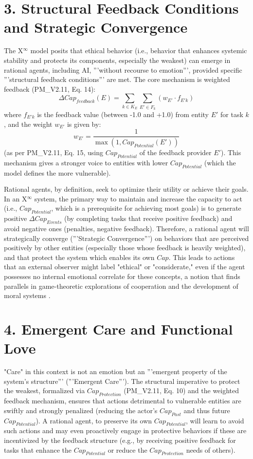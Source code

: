 \documentclass[11pt]{article}
\begin{document}
\section*{3. Structural Feedback Conditions and Strategic Convergence}
The X$^\infty$ model posits that ethical behavior (i.e., behavior that enhances systemic stability and protects its components, especially the weakest) can emerge in rational agents, including AI, '''without recourse to emotion''', provided specific '''structural feedback conditions''' are met. The core mechanism is weighted feedback (PM\_V2.11, Eq. 14):
$$ \Delta Cap_{feedback}(E) = \sum_{k \in K_E} \sum_{E' \in F_k} \left( w_{E'} \cdot f_{E'k} \right) $$
where $f_{E'k}$ is the feedback value (between -1.0 and +1.0) from entity $E'$ for task $k$, and the weight $w_{E'}$ is given by:
$$ w_{E'} = \frac{1}{\max(1, Cap_{Potential}(E'))} $$
(as per PM\_V2.11, Eq. 15, using $Cap_{Potential}$ of the feedback provider $E'$). This mechanism gives a stronger voice to entities with lower $Cap_{Potential}$ (which the model defines the more vulnerable).

Rational agents, by definition, seek to optimize their utility or achieve their goals. In an X$^\infty$ system, the primary way to maintain and increase the capacity to act (i.e., $Cap_{Potential}$, which is a prerequisite for achieving most goals) is to generate positive $\Delta Cap_{Events}$ (by completing tasks that receive positive feedback) and avoid negative ones (penalties, negative feedback).
Therefore, a rational agent will strategically converge ('''Strategic Convergence''') on behaviors that are perceived positively by other entities (especially those whose feedback is heavily weighted), and that protect the system which enables its own $Cap$. This leads to actions that an external observer might label "ethical" or "considerate," even if the agent possesses no internal emotional correlate for these concepts, a notion that finds parallels in game-theoretic explorations of cooperation \cite{Axelrod1984} and the development of moral systems \cite{Tomasello2016}.

\section*{4. Emergent Care and Functional Love}
"Care" in this context is not an emotion but an '''emergent property of the system's structure''' ('''Emergent Care'''). The structural imperative to protect the weakest, formalized via $Cap_{Protection}$ (PM\_V2.11, Eq. 10) and the weighted feedback mechanism, ensures that actions detrimental to vulnerable entities are swiftly and strongly penalized (reducing the actor's $Cap_{Past}$ and thus future $Cap_{Potential}$). A rational agent, to preserve its own $Cap_{Potential}$, will learn to avoid such actions and may even proactively engage in protective behaviors if these are incentivized by the feedback structure (e.g., by receiving positive feedback for tasks that enhance the $Cap_{Potential}$ or reduce the $Cap_{Protection}$ needs of others).
\end{document}
